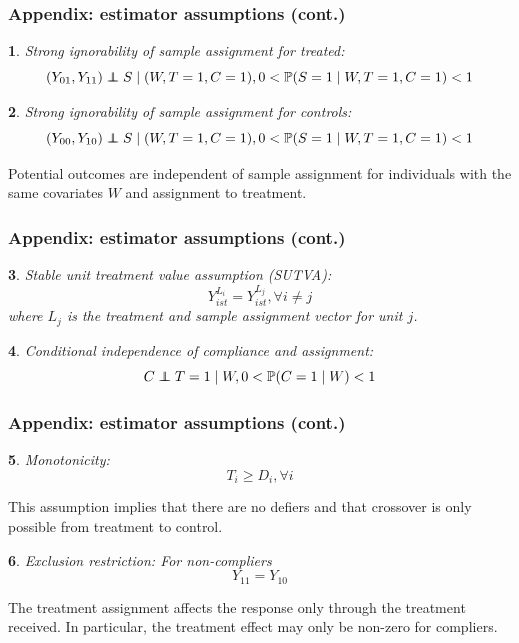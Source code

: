 \documentclass{beamer}
\makeatletter
\newtheorem*{assumption*}{\assumptionnumber}
\providecommand{\assumptionnumber}{}
\newenvironment{assumption}[2]
 {%
  \renewcommand{\assumptionnumber}{Assumption #1}%
  \begin{assumption*}%
  \protected@edef\@currentlabel{#1}%
 }
 {%
  \end{assumption*}
 }
\newcommand{\pr}{\mathbb{P}} %
\newcommand\independent{\protect\mathpalette{\protect\independenT}{\perp}}
\def\independenT#1#2{\mathrel{\rlap{$#1#2$}\mkern2mu{#1#2}}}
\makeatother
\begin{document}
\begin{frame}
\frametitle{Appendix: estimator assumptions (cont.)}
\begin{assumption}{2}{}\label{si_treat}
Strong ignorability of sample assignment for treated:
\begin{equation*}
(Y_{01}, Y_{11}) \independent S \mid (W, T=1,C = 1), 0 < \pr(S=1 \mid W, T=1,C = 1) <1 
\end{equation*}
\end{assumption}

\begin{assumption}{3}{}\label{si_ctrl}
Strong ignorability of sample assignment for controls:
\begin{equation*}
(Y_{00}, Y_{10}) \independent S \mid (W, T=1,C = 1), 0 < \pr(S=1 \mid W, T=1,C = 1) <1 
\end{equation*}\end{assumption}

\noindent Potential outcomes are independent of sample assignment for individuals with the same covariates $W$ and assignment to treatment.
\end{frame}

\begin{frame}
\frametitle{Appendix: estimator assumptions (cont.)}
\begin{assumption}{4}{}\label{sutva}
Stable unit treatment value assumption (SUTVA):
\begin{equation*}
Y_{ist}^{L_i} = Y_{ist}^{L_j},  \forall i \neq j
\end{equation*}
where $L_j$ is the treatment and sample assignment vector for unit $j$. \end{assumption}
 
\begin{assumption}{5}{}\label{compl}
Conditional independence of compliance and assignment:
\begin{equation*}
C \independent T=1 \mid W, 0 < \pr(C = 1 \mid W) < 1
\end{equation*}
\end{assumption}
\end{frame}

\begin{frame}
\frametitle{Appendix: estimator assumptions (cont.)}
\begin{assumption}{6}{}\label{monotonicity}
Monotonicity: 
\begin{equation*}
T_i \geq D_i, \forall i
\end{equation*}
\end{assumption}
\noindent This assumption implies that there are no defiers and that crossover is only possible from treatment to control.
\begin{assumption}{7}{}\label{ER}
Exclusion restriction: For non-compliers
\begin{equation*}
Y_{11} = Y_{10}
\end{equation*}  
\end{assumption}
\noindent The treatment assignment affects the response only through the treatment received.  In particular, the treatment effect may only be non-zero for compliers.  
\end{frame}



		
\end{document}
